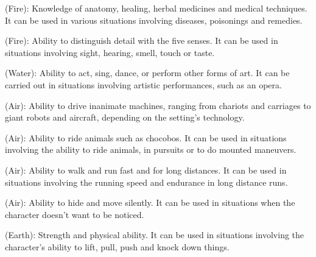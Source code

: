 \begin{multicols}{2}
\begin{ffcolpage}
 (Fire): Knowledge of anatomy, healing, herbal medicines and medical techniques. It can be used in various situations involving diseases, poisonings and remedies.
\end{ffcolpage} \pw

\noindent\parbox{.15\textwidth}{
}\begin{minipage}{.35\textwidth-1\columnsep}
 (Fire): Ability to distinguish detail with the five senses. It can be used in situations involving sight, hearing, smell, touch or
taste. 
\par\pw
{} (Water): Ability to act, sing, dance, or perform other forms of art. It can be carried out in situations involving artistic performances, such as an opera.
\end{minipage}
\pw

\begin{ffcolpage}
 (Air): Ability to drive inanimate machines, ranging from chariots and carriages to giant robots and aircraft, depending on the setting’s technology.
\end{ffcolpage} \pw

\begin{ffcolpage}
 (Air): Ability to ride animals such as chocobos. It can be used in situations involving the ability to ride animals, in pursuits or to do mounted maneuvers.
\end{ffcolpage} \pw

\begin{ffcolpage}
 (Air): Ability to walk and run fast and for long distances. It can be used in situations involving the running speed and endurance in long distance runs.
\end{ffcolpage} \pw

\begin{ffcolpage}
 (Air): Ability to hide and move silently. It can be used in situations when the character doesn’t want to be noticed.
\end{ffcolpage} \pw

\begin{ffcolpage}
 (Earth): Strength and physical ability. It can be used in situations involving the character's ability to lift, pull, push and knock down things.
\end{ffcolpage} \pw


\end{multicols}
